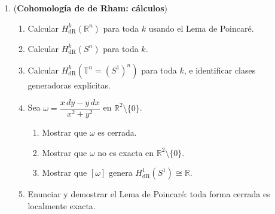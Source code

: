 \documentclass[11pt,a4paper]{article}
\theoremstyle{plain}
\theoremstyle{definition}
\theoremstyle{remark}
\newcommand{\RR}{\mathbb R}
\begin{document}
\begin{enumerate}[label=\arabic*.,leftmargin=*]
\item (\textbf{Cohomología de de Rham: cálculos})
\begin{enumerate}[label=\alph*)]
\item Calcular $H^k_{\mathrm{dR}}(\RR^n)$ para toda $k$ usando el Lema de
Poincaré.
\item Calcular $H^k_{\mathrm{dR}}(S^n)$ para toda $k$.
\item Calcular $H^k_{\mathrm{dR}}(\mathbb T^n=(S^1)^n)$ para toda $k$, e
identificar clases generadoras explícitas.
\item Sea $\omega=\dfrac{x\,dy-y\,dx}{x^2+y^2}$ en $\RR^2\setminus\{0\}$.
\begin{enumerate}[label=\arabic*)]
\item Mostrar que $\omega$ es cerrada.
\item Mostrar que $\omega$ no es exacta en $\RR^2\setminus\{0\}$.
\item Mostrar que $[\omega]$ genera $H^1_{\mathrm{dR}}(S^1)\cong\RR$.
\end{enumerate}
\item Enunciar y demostrar el Lema de Poincaré: toda forma cerrada es
localmente exacta.
\end{enumerate}


\end{enumerate}
\end{document}
